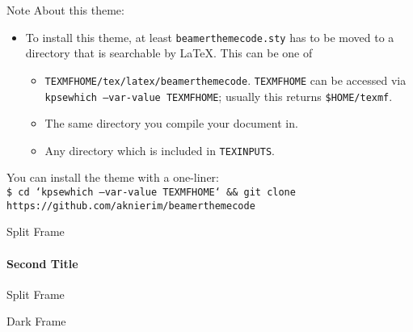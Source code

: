 \begin{frame}{Note}
  About this theme:
  \begin{itemize}
    \item To install this theme, at least \texttt{beamerthemecode.sty} has to be moved to a directory that is searchable by \LaTeX.
      This can be one of
      \begin{itemize}
        \item \texttt{TEXMFHOME/tex/latex/beamerthemecode}. \texttt{TEXMFHOME} can be accessed via \texttt{kpsewhich --var-value TEXMFHOME};
          usually this returns \texttt{\$HOME/texmf}.
        \item The same directory you compile your document in.
        \item Any directory which is included in \texttt{TEXINPUTS}.
      \end{itemize}
  \end{itemize}

  You can install the theme with a one-liner:\\
  \texttt{\footnotesize\$ cd `kpsewhich --var-value TEXMFHOME` \&\& git clone https://github.com/aknierim/beamerthemecode}
\end{frame}


\begin{frame}[split]{Split Frame}
  \framesubtitle{Second Title}
\end{frame}

\begin{frame}[split=0.4]{Split Frame}
   
\end{frame}

\begin{frame}[full]{Dark Frame}
   
\end{frame}
